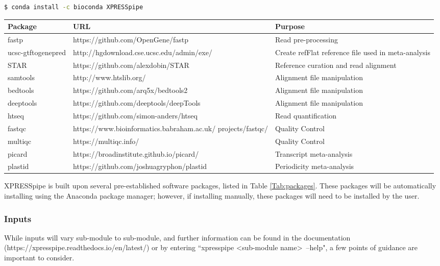 \documentclass[11pt, a4paper, oneside]{article}
\begin{document}
\begin{lstlisting}[language=bash, caption=curateReference example]
$ conda install -c bioconda XPRESSpipe
\end{lstlisting}

\begin{tabular}{p{2.4cm}p{7.5cm}p{6.5cm}}
 \textbf{Package} & \textbf{URL} & \textbf{Purpose} \\
 \hline
 fastp & https://github.com/OpenGene/fastp & Read pre-processing \\
 \hline
 ucsc-gtftogenepred & http://hgdownload.cse.ucsc.edu/admin/exe/ & Create refFlat reference file used in meta-analysis \\
 \hline
 STAR & https://github.com/alexdobin/STAR & Reference curation and read alignment \\
 \hline
 samtools & http://www.htslib.org/ & Alignment file manipulation \\
 \hline
 bedtools & https://github.com/arq5x/bedtools2 & Alignment file manipulation \\
 \hline
 deeptools & https://github.com/deeptools/deepTools & Alignment file manipulation \\
 \hline
 htseq & https://github.com/simon-anders/htseq & Read quantification \\
 \hline
 fastqc & https://www.bioinformatics.babraham.ac.uk/ projects/fastqc/ & Quality Control \\
 \hline
 multiqc & https://multiqc.info/ & Quality Control \\
 \hline
 picard & https://broadinstitute.github.io/picard/ & Transcript meta-analysis \\
 \hline
 plastid & https://github.com/joshuagryphon/plastid & Periodicity meta-analysis \\
\end{tabular}
\newline

XPRESSpipe is built upon several pre-established software packages, listed in Table \ref{Tab:packages}. These packages will be automatically installing using the Anaconda package manager; however, if installing manually, these packages will need to be installed by the user.

\subsubsection{Inputs}
While inputs will vary sub-module to sub-module, and further information can be found in the documentation (https://xpresspipe.readthedocs.io/en/latest/) or by entering ``xpresspipe \textless sub-module name\textgreater \ --help", a few points of guidance are important to consider.
\end{document}
